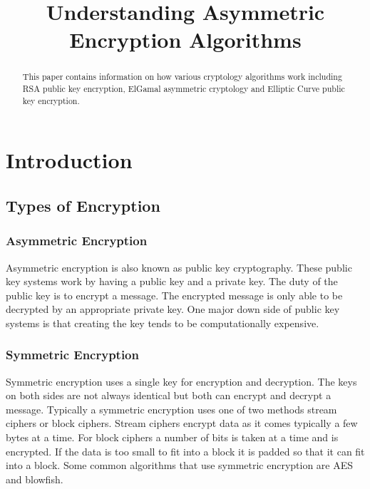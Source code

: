 \documentclass[conference]{IEEEtran}
\begin{document}
\title{Understanding Asymmetric Encryption Algorithms}


\author{
\and
{}
}

\maketitle

\begin{abstract}
	This paper contains information on how various cryptology algorithms work including RSA public key encryption, ElGamal asymmetric cryptology and Elliptic Curve public key encryption.
\end{abstract}

\IEEEpeerreviewmaketitle



\section{Introduction}

\subsection{Types of Encryption}


\subsubsection{Asymmetric Encryption}
Asymmetric encryption is also known as public key cryptography. These public key systems work by having a public key and a private key. The duty of the public key is to encrypt a message. The encrypted message is only able to be decrypted by an appropriate private key. One major down side of public key systems is that creating the key tends to be computationally expensive.
\subsubsection{Symmetric Encryption}
Symmetric encryption uses a single key for encryption and decryption. The keys on both sides are not always identical but both can encrypt and decrypt a message. Typically a symmetric encryption uses one of two methods stream ciphers or block ciphers. Stream ciphers encrypt data as it comes typically a few bytes at a time. For block ciphers a number of bits is taken at a time and is encrypted. If the data is too small to fit into a block it is padded so that it can fit into a block. Some common algorithms that use symmetric encryption are AES and blowfish.
\end{document}

